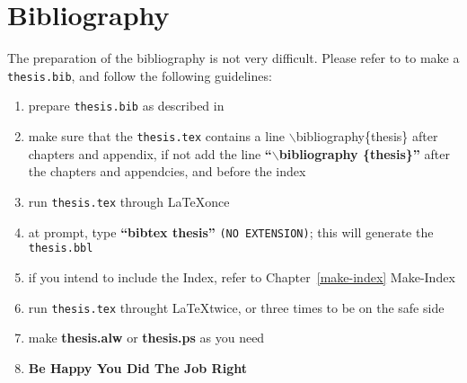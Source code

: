 \chapter{Bibliography}

The preparation of the bibliography is not very
difficult. Please refer to \cite[pp:140-147]{lamport86} to make a {\tt
thesis.bib}, and follow the following guidelines:

\begin{enumerate}
  \item prepare {\tt thesis.bib} as described in \cite{lamport86}
  \item make sure that the {\tt thesis.tex} contains a line 
     $\backslash$bibliography\{thesis\} after chapters and appendix, if not
    \subitem add the line {\bf ``$\backslash$bibliography \{thesis\}''}
	after the chapters and appendcies, and before the index
  \item run {\tt thesis.tex} through \LaTeX once
  \item at prompt, type {\bf ``bibtex thesis''} {\tt (NO EXTENSION)}; this 
	will generate the {\tt thesis.bbl}
  \item if you intend to include the Index, refer to Chapter~\ref{make-index}
	 Make-Index
  \item run {\tt thesis.tex} throught \LaTeX twice, or three times to be on
	the safe side
  \item make {\bf thesis.alw} or {\bf thesis.ps} as you need
  \item {\bf Be Happy You Did The Job Right}
\end{enumerate}
